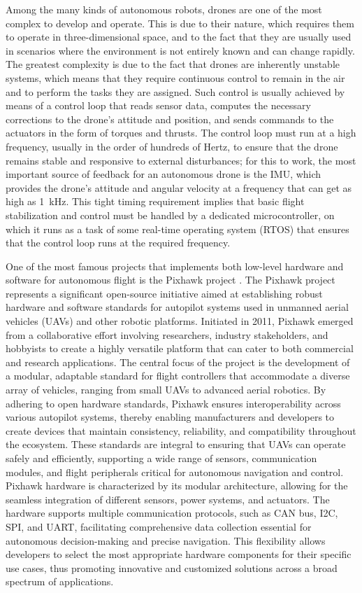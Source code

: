 Among the many kinds of autonomous robots, drones are one of the most complex to develop and operate. This is due to their nature, which requires them to operate in three-dimensional space, and to the fact that they are usually used in scenarios where the environment is not entirely known and can change rapidly. The greatest complexity is due to the fact that drones are inherently unstable systems, which means that they require continuous control to remain in the air and to perform the tasks they are assigned. Such control is usually achieved by means of a control loop that reads sensor data, computes the necessary corrections to the drone's attitude and position, and sends commands to the actuators in the form of torques and thrusts. The control loop must run at a high frequency, usually in the order of hundreds of Hertz, to ensure that the drone remains stable and responsive to external disturbances; for this to work, the most important source of feedback for an autonomous drone is the IMU, which provides the drone's attitude and angular velocity at a frequency that can get as high as \SI{1}{\kilo\hertz}. This tight timing requirement implies that basic flight stabilization and control must be handled by a dedicated microcontroller, on which it runs as a task of some real-time operating system (RTOS) that ensures that the control loop runs at the required frequency.

One of the most famous projects that implements both low-level hardware and software for autonomous flight is the Pixhawk project \cite{meier_pixhawk_2011,meier_pixhawk_2012}. The Pixhawk project represents a significant open-source initiative aimed at establishing robust hardware and software standards for autopilot systems used in unmanned aerial vehicles (UAVs) and other robotic platforms. Initiated in 2011, Pixhawk emerged from a collaborative effort involving researchers, industry stakeholders, and hobbyists to create a highly versatile platform that can cater to both commercial and research applications. The central focus of the project is the development of a modular, adaptable standard for flight controllers that accommodate a diverse array of vehicles, ranging from small UAVs to advanced aerial robotics. By adhering to open hardware standards, Pixhawk ensures interoperability across various autopilot systems, thereby enabling manufacturers and developers to create devices that maintain consistency, reliability, and compatibility throughout the ecosystem. These standards are integral to ensuring that UAVs can operate safely and efficiently, supporting a wide range of sensors, communication modules, and flight peripherals critical for autonomous navigation and control. Pixhawk hardware is characterized by its modular architecture, allowing for the seamless integration of different sensors, power systems, and actuators. The hardware supports multiple communication protocols, such as CAN bus, I2C, SPI, and UART, facilitating comprehensive data collection essential for autonomous decision-making and precise navigation. This flexibility allows developers to select the most appropriate hardware components for their specific use cases, thus promoting innovative and customized solutions across a broad spectrum of applications.

